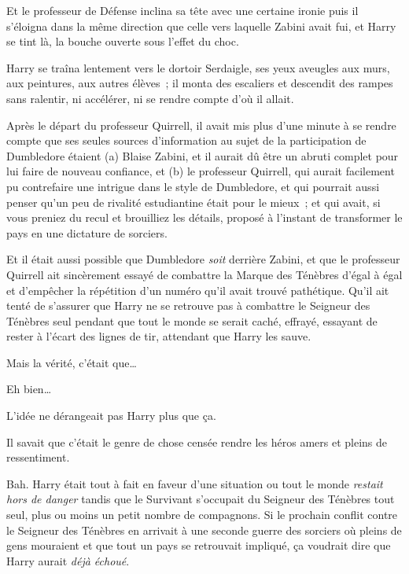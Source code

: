 Et le professeur de Défense inclina sa tête avec une certaine ironie puis il s'éloigna dans la même direction que celle vers laquelle Zabini avait fui, et Harry se tint là, la bouche ouverte sous l'effet du choc.


Harry se traîna lentement vers le dortoir Serdaigle, ses yeux aveugles aux murs, aux peintures, aux autres élèves~; il monta des escaliers et descendit des rampes sans ralentir, ni accélérer, ni se rendre compte d'où il allait.

Après le départ du professeur Quirrell, il avait mis plus d'une minute à se rendre compte que ses seules sources d'information au sujet de la participation de Dumbledore étaient (a) Blaise Zabini, et il aurait dû être un abruti complet pour lui faire de nouveau confiance, et (b) le professeur Quirrell, qui aurait facilement pu contrefaire une intrigue dans le style de Dumbledore, et qui pourrait aussi penser qu'un peu de rivalité estudiantine était pour le mieux~; et qui avait, si vous preniez du recul et brouilliez les détails, proposé à l'instant de transformer le pays en une dictature de sorciers.

Et il était aussi possible que Dumbledore \emph{soit} derrière Zabini, et que le professeur Quirrell ait sincèrement essayé de combattre la Marque des Ténèbres d'égal à égal et d'empêcher la répétition d'un numéro qu'il avait trouvé pathétique. Qu'il ait tenté de s'assurer que Harry ne se retrouve pas à combattre le Seigneur des Ténèbres seul pendant que tout le monde se serait caché, effrayé, essayant de rester à l'écart des lignes de tir, attendant que Harry les sauve.

Mais la vérité, c'était que…

Eh bien…

L'idée ne dérangeait pas Harry plus que ça.

Il savait que c'était le genre de chose censée rendre les héros amers et pleins de ressentiment.

Bah. Harry était tout à fait en faveur d'une situation ou tout le monde \emph{restait hors de danger} tandis que le Survivant s'occupait du Seigneur des Ténèbres tout seul, plus ou moins un petit nombre de compagnons. Si le prochain conflit contre le Seigneur des Ténèbres en arrivait à une seconde guerre des sorciers où pleins de gens mouraient et que tout un pays se retrouvait impliqué, ça voudrait dire que Harry aurait \emph{déjà échoué}.

